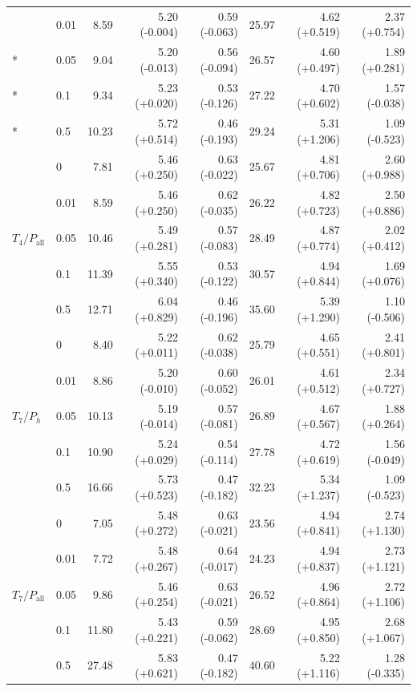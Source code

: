\begin{longtable}{@{}llrrrrrr@{}}
 & 0.01 & 8.59 & 5.20 (-0.004) & 0.59 (-0.063) & 25.97 & 4.62 (+0.519) & 2.37 (+0.754) \\*
 & 0.05 & 9.04 & 5.20 (-0.013) & 0.56 (-0.094) & 26.57 & 4.60 (+0.497) & 1.89 (+0.281) \\*
 & 0.1 & 9.34 & 5.23 (+0.020) & 0.53 (-0.126) & 27.22 & 4.70 (+0.602) & 1.57 (-0.038) \\*
 & 0.5 & 10.23 & 5.72 (+0.514) & 0.46 (-0.193) & 29.24 & 5.31 (+1.206) & 1.09 (-0.523) \\
\midrule
\multirow{5}{*}{$T_4/P_{\mathrm{all}}$} & 0 & 7.81 & 5.46 (+0.250) & 0.63 (-0.022) & 25.67 & 4.81 (+0.706) & 2.60 (+0.988) \\*
 & 0.01 & 8.59 & 5.46 (+0.250) & 0.62 (-0.035) & 26.22 & 4.82 (+0.723) & 2.50 (+0.886) \\*
 & 0.05 & 10.46 & 5.49 (+0.281) & 0.57 (-0.083) & 28.49 & 4.87 (+0.774) & 2.02 (+0.412) \\*
 & 0.1 & 11.39 & 5.55 (+0.340) & 0.53 (-0.122) & 30.57 & 4.94 (+0.844) & 1.69 (+0.076) \\*
 & 0.5 & 12.71 & 6.04 (+0.829) & 0.46 (-0.196) & 35.60 & 5.39 (+1.290) & 1.10 (-0.506) \\
\midrule
\multirow{5}{*}{$T_7/P_{h}$} & 0 & 8.40 & 5.22 (+0.011) & 0.62 (-0.038) & 25.79 & 4.65 (+0.551) & 2.41 (+0.801) \\*
 & 0.01 & 8.86 & 5.20 (-0.010) & 0.60 (-0.052) & 26.01 & 4.61 (+0.512) & 2.34 (+0.727) \\*
 & 0.05 & 10.13 & 5.19 (-0.014) & 0.57 (-0.081) & 26.89 & 4.67 (+0.567) & 1.88 (+0.264) \\*
 & 0.1 & 10.90 & 5.24 (+0.029) & 0.54 (-0.114) & 27.78 & 4.72 (+0.619) & 1.56 (-0.049) \\*
 & 0.5 & 16.66 & 5.73 (+0.523) & 0.47 (-0.182) & 32.23 & 5.34 (+1.237) & 1.09 (-0.523) \\
\midrule
\multirow{5}{*}{$T_7/P_{\mathrm{all}}$} & 0 & 7.05 & 5.48 (+0.272) & 0.63 (-0.021) & 23.56 & 4.94 (+0.841) & 2.74 (+1.130) \\*
 & 0.01 & 7.72 & 5.48 (+0.267) & 0.64 (-0.017) & 24.23 & 4.94 (+0.837) & 2.73 (+1.121) \\*
 & 0.05 & 9.86 & 5.46 (+0.254) & 0.63 (-0.021) & 26.52 & 4.96 (+0.864) & 2.72 (+1.106) \\*
 & 0.1 & 11.80 & 5.43 (+0.221) & 0.59 (-0.062) & 28.69 & 4.95 (+0.850) & 2.68 (+1.067) \\*
 & 0.5 & 27.48 & 5.83 (+0.621) & 0.47 (-0.182) & 40.60 & 5.22 (+1.116) & 1.28 (-0.335) \\
\bottomrule
\end{longtable}
\endgroup

